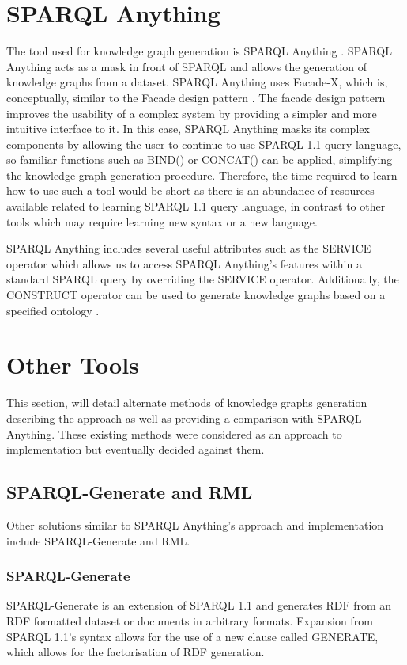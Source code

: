 \section{SPARQL Anything}
\hspace{0.5cm} The tool used for knowledge graph generation is SPARQL Anything \cite{sparqlanythinggithub}. SPARQL Anything acts as a mask in front of SPARQL and allows the generation of knowledge graphs from a dataset. SPARQL Anything uses Facade-X, which is, conceptually, similar to the Facade design pattern \cite{sparqlanything}. The facade design pattern improves the usability of a complex system by providing a simpler and more intuitive interface to it. In this case, SPARQL Anything masks its complex components by allowing the user to continue to use SPARQL 1.1 query language, so familiar functions such as BIND() or CONCAT() can be applied, simplifying the knowledge graph generation procedure. Therefore, the time required to learn how to use such a tool would be short as there is an abundance of resources available related to learning SPARQL 1.1 query language, in contrast to other tools which may require learning new syntax or a new language. 

SPARQL Anything includes several useful attributes such as the SERVICE operator which allows us to access SPARQL Anything's features within a standard SPARQL query by overriding the SERVICE operator. Additionally, the CONSTRUCT operator can be used to generate knowledge graphs based on a specified ontology \cite{sparqlanythinggithub}.

\section{Other Tools}
\hspace{0.5cm} This section, will detail alternate methods of knowledge graphs generation describing the approach as well as providing a comparison with SPARQL Anything. These existing methods were considered as an approach to implementation but eventually decided against them. 

\subsection{SPARQL-Generate and RML}
\hspace{0.5cm} Other solutions similar to SPARQL Anything's approach and implementation include SPARQL-Generate and RML. 

\subsubsection{SPARQL-Generate}
\hspace{0.5cm} SPARQL-Generate is an extension of SPARQL 1.1 and generates RDF from an RDF formatted dataset or documents in arbitrary formats. Expansion from SPARQL 1.1's syntax allows for the use of a new clause called GENERATE, which allows for the factorisation of RDF generation. \cite{lefranccois2017sparql}


